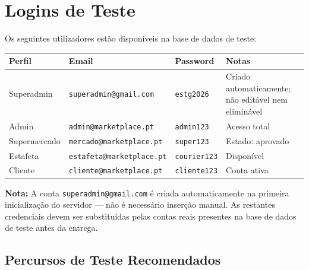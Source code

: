\documentclass[12pt,a4paper]{article}
\begin{document}
\section{Logins de Teste}

Os seguintes utilizadores estão disponíveis na base de dados de teste:

\begin{center}
\begin{tabular}{llll}
\toprule
\textbf{Perfil} & \textbf{Email} & \textbf{Password} & \textbf{Notas} \\
\midrule
Superadmin   & \texttt{superadmin@gmail.com}      & \texttt{estg2026}   & Criado automaticamente; não editável nem eliminável \\
Admin        & \texttt{admin@marketplace.pt}      & \texttt{admin123}   & Acesso total \\
Supermercado & \texttt{mercado@marketplace.pt}    & \texttt{super123}   & Estado: aprovado \\
Estafeta     & \texttt{estafeta@marketplace.pt}   & \texttt{courier123} & Disponível \\
Cliente      & \texttt{cliente@marketplace.pt}    & \texttt{cliente123} & Conta ativa \\
\bottomrule
\end{tabular}
\end{center}

\begin{infobox}
\textbf{Nota:} A conta \texttt{superadmin@gmail.com} é criada automaticamente na primeira inicialização do servidor — não é necessário inserção manual. As restantes credenciais devem ser substituídas pelas contas reais presentes na base de dados de teste antes da entrega.
\end{infobox}

\subsection{Percursos de Teste Recomendados}
\end{document}
